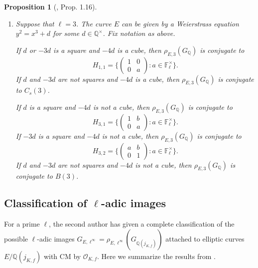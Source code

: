 \documentclass[11pt]{amsart}
\newtheorem{prop}[defn]{Proposition}
\theoremstyle{definition}
\newenvironment{romanenum}{\hfill \begin{enumerate} \renewcommand{\theenumi}{\roman{enumi}}}{\end{enumerate}}
\newcommand{\Q}{\mathbb Q}
\newcommand{\QQ}{\mathbb Q}
\newcommand{\FF}{\mathbb F}
\newcommand{\OO}{\mathcal{O}}
\begin{document}
\begin{prop}[\cite{zywina}, Prop. 1.16]
\begin{romanenum}
\item  \label{P:j=0 situation v}
Suppose that $\ell=3$.  The curve $E$ can be given by a Weierstrass equation $y^2=x^3+d$ for some $d\in \QQ^\times$.   Fix notation as above.

\noindent
If $d$ or $-3d$ is a square and $-4d$ is a cube, then $\rho_{E,3}(G_\Q)$ is conjugate to
\[
H_{1,1}=\{ \left(\begin{smallmatrix} 1 & 0 \\0 & a \end{smallmatrix}\right) : a\in \FF_\ell^\times\}.
\]
\noindent
If $d$ and $-3d$ are not squares and $-4d$ is a cube, then $\rho_{E,3}(G_\Q)$ is conjugate to $C_s(3)$.

\noindent
If $d$ is a square and $-4d$ is not a cube, then $\rho_{E,3}(G_\Q)$ is conjugate to
\[
H_{3,1}=\{ \left(\begin{smallmatrix} 1 & b \\0 & a \end{smallmatrix}\right) : a\in \FF_\ell^\times\}.
\]
\noindent
If $-3d$ is a square and $-4d$ is not a cube, then $\rho_{E,3}(G_\Q)$ is conjugate to 
\[
H_{3,2}=\{ \left(\begin{smallmatrix} a & b \\0 & 1 \end{smallmatrix}\right) : a\in \FF_\ell^\times\}.
\]
\noindent
If $d$ and $-3d$ are not squares and $-4d$ is not a cube, then $\rho_{E,3}(G_\Q)$ is conjugate to $B(3)$.

\end{romanenum}
\end{prop}





\subsection{Classification of $\ell$-adic images} \label{sec-alvaroCMresults}

For a prime $\ell$, the second author has given a complete classification of the possible $\ell$-adic images $G_{E,\ell^\infty} = \rho_{E,\ell^{\infty}}(G_{\Q(j_{K,f})})$ attached to elliptic curves $E/\Q(j_{K,f})$ with CM by $\OO_{K,f}$.  Here we summarize the  results from \cite{lozano-galoiscm}. 
\end{document}
